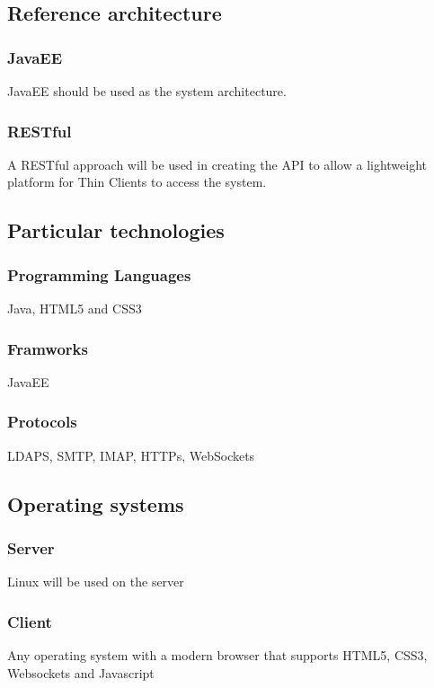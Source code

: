 
\subsection{Reference architecture}
	\subsubsection{JavaEE}
		JavaEE should be used as the system architecture.
	\subsubsection{RESTful}
		A RESTful approach will be used in creating the API to allow a lightweight platform for Thin Clients to access the system.
\subsection{Particular technologies}
	\subsubsection{Programming Languages}
		Java, HTML5 and CSS3
	\subsubsection{Framworks}
		JavaEE
	\subsubsection{Protocols}
		LDAPS, SMTP, IMAP, HTTPs, WebSockets	
\subsection{Operating systems}
	\subsubsection{Server}
		Linux will be used on the server
	\subsubsection{Client}
		Any operating system with a modern browser that supports HTML5, CSS3, Websockets and Javascript
	